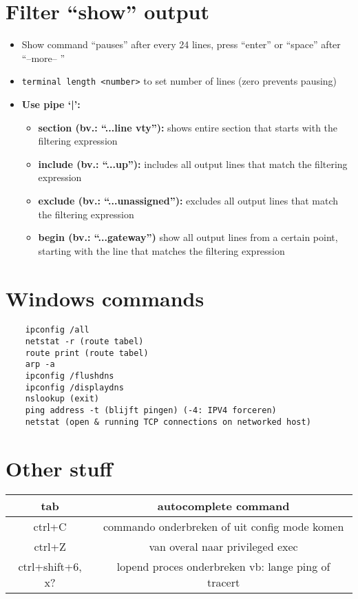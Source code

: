 \documentclass[10pt, a4paper]{article}
\begin{document}
	\section{Filter ``show'' output}
	\begin{itemize}[noitemsep,nolistsep]
	\item Show command ``pauses'' after every 24 lines, press ``enter'' or ``space'' after ``--more-- ''
	\item \texttt{terminal length <number>} to set number of lines (zero prevents pausing)\\
	\item \textbf{Use pipe `|':}
	\begin{itemize}[noitemsep,nolistsep]
	\item \textbf{section (bv.: ``...line vty''):} shows entire section that starts with the filtering expression
	\item \textbf{include (bv.: ``...up''):} includes all output lines that match the filtering expression
	\item \textbf{exclude (bv.: ``...unassigned''):} excludes all output lines that match the filtering expression
	\item \textbf{begin (bv.: ``...gateway'')} show all output lines from a certain point, starting with the line that matches the filtering expression\\
	\end{itemize}
	\end{itemize}

	\section{Windows commands}
	\begin{lstlisting}
	ipconfig /all
	netstat -r (route tabel)
	route print (route tabel)
	arp -a
	ipconfig /flushdns
	ipconfig /displaydns
	nslookup (exit)
	ping address -t (blijft pingen) (-4: IPV4 forceren)
	netstat (open & running TCP connections on networked host)
	\end{lstlisting}

	\section{Other stuff}
	\begin{tabular}{|c|c|}
	\hline \rule[-1ex]{0pt}{4ex} tab & autocomplete command \\
	\hline \rule[-1ex]{0pt}{4ex} ctrl+C  & commando onderbreken  of uit config mode komen\\
	\hline \rule[-1ex]{0pt}{4ex} ctrl+Z & van overal naar privileged exec\\
	\hline \rule[-1ex]{0pt}{4ex} ctrl+shift+6, x? & lopend proces onderbreken vb: lange ping of tracert\\
	\hline
	\end{tabular} \\ \\
\end{document}
